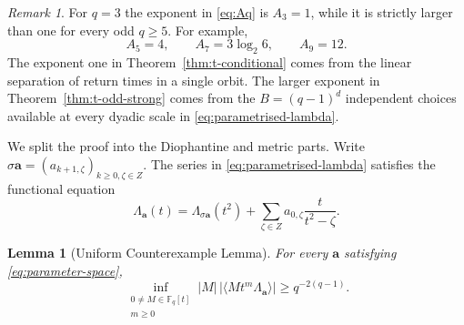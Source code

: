 \documentclass[11pt]{article}
\newtheorem{lemma}[theorem]{Lemma}
\theoremstyle{remark}
\newtheorem{remark}[theorem]{Remark}
\begin{document}
\begin{remark}
For $q=3$ the exponent in \eqref{eq:Aq} is $A_3=1$, while it is
strictly larger than one for every odd $q\geq5$.  For example,
\[
 A_5=4,\qquad A_7=3\log_2 6,\qquad A_9=12.
\]
The exponent one in Theorem~\ref{thm:t-conditional} comes from the
linear separation of return times in a single orbit.  The larger
exponent in Theorem~\ref{thm:t-odd-strong} comes from the
$B=(q-1)^d$ independent choices available at every dyadic scale in
\eqref{eq:parametrised-lambda}.
\end{remark}

We split the proof into the Diophantine and metric parts.  Write
$\sigma\mathbf a=(a_{k+1,\zeta})_{k\geq0,\zeta\in Z}$.  The series
in \eqref{eq:parametrised-lambda} satisfies the functional equation
\begin{equation} \label{eq:parametrised-functional-equation}
 \Lambda_{\mathbf a}(t)
 =\Lambda_{\sigma\mathbf a}(t^2)
  +\sum_{\zeta\in Z}a_{0,\zeta}\frac{t}{t^2-\zeta}.
\end{equation}

\begin{lemma}[Uniform Counterexample Lemma]\label{un_contrex_lemma_tadic}
For every $\mathbf a$ satisfying \eqref{eq:parameter-space},
\begin{equation} \label{eq:uniform-parametrised-bound}
 \inf_{\substack{0\ne M\in\mathbb F_q[t]\\m\geq0}}
 |M|\,|\langle Mt^m\Lambda_{\mathbf a}\rangle|
 \geq q^{-2(q-1)}.
\end{equation}
\end{lemma}
\end{document}
